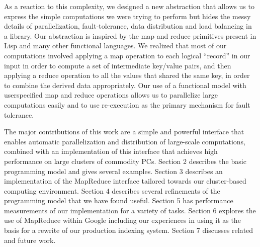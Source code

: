 \documentclass[a4paper,12pt]{article}
\begin{document}
	As a reaction to this complexity, we designed a new
	abstraction that allows us to express the simple computations we were trying to perform but hides the messy details of parallelization, fault-tolerance, data distribution
	and load balancing in a library. Our abstraction is inspired by the map and reduce primitives present in Lisp
	and many other functional languages. We realized that
	most of our computations involved applying a map operation to each logical “record” in our input in order to
	compute a set of intermediate key/value pairs, and then
	applying a reduce operation to all the values that shared
	the same key, in order to combine the derived data appropriately. Our use of a functional model with userspecified map and reduce operations allows us to parallelize large computations easily and to use re-execution
	as the primary mechanism for fault tolerance.
	
	The major contributions of this work are a simple and
	powerful interface that enables automatic parallelization
	and distribution of large-scale computations, combined
	with an implementation of this interface that achieves
	high performance on large clusters of commodity PCs.
	Section 2 describes the basic programming model and
	gives several examples. Section 3 describes an implementation of the MapReduce interface tailored towards
	our cluster-based computing environment. Section 4 describes several refinements of the programming model
	that we have found useful. Section 5 has performance
	measurements of our implementation for a variety of
	tasks. Section 6 explores the use of MapReduce within
	Google including our experiences in using it as the basis for a rewrite of our production indexing system. Section 7 discusses related and future work.
	
\end{document}
